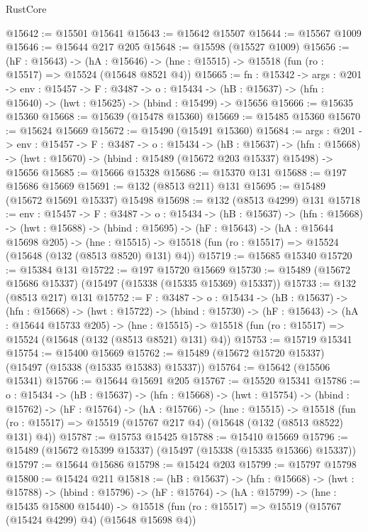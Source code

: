 \begin{lexlean}{RustCore}
\begin{coremodule}
@15642 := @15501 @15641
@15643 := @15642 @15507
@15644 := @15567 @1009
@15646 := @15644 @217 @205
@15648 := @15598 (@15527 @1009)
@15656 := (hF : @15643) ->
  (hA : @15646) -> (hne : @15515) -> @15518 (fun (ro : @15517) => @15524 (@15648 @8521 @4))
@15665 := {fn : @15342} ->
  {args : @201} ->
  {env : @15457} ->
  {F : @3487} ->
  {o : @15434} -> (hB : @15637) -> (hfn : @15640) -> (hwt : @15625) -> (hbind : @15499) -> @15656
@15666 := @15635 @15360
@15668 := @15639 (@15478 @15360)
@15669 := @15485 @15360
@15670 := @15624 @15669
@15672 := @15490 (@15491 @15360)
@15684 := {args : @201} ->
  {env : @15457} ->
  {F : @3487} ->
  {o : @15434} ->
  (hB : @15637) ->
  (hfn : @15668) -> (hwt : @15670) -> (hbind : @15489 (@15672 @203 @15337) @15498) -> @15656
@15685 := @15666 @15328
@15686 := @15370 @131
@15688 := @197 @15686 @15669
@15691 := @132 (@8513 @211) @131
@15695 := @15489 (@15672 @15691 @15337) @15498
@15698 := @132 (@8513 @4299) @131
@15718 := {env : @15457} ->
  {F : @3487} ->
  {o : @15434} ->
  (hB : @15637) ->
  (hfn : @15668) ->
  (hwt : @15688) ->
  (hbind : @15695) ->
  (hF : @15643) ->
  (hA : @15644 @15698 @205) ->
  (hne : @15515) -> @15518 (fun (ro : @15517) => @15524 (@15648 (@132 (@8513 @8520) @131) @4))
@15719 := @15685 @15340
@15720 := @15384 @131
@15722 := @197 @15720 @15669
@15730 := @15489 (@15672 @15686 @15337) (@15497 (@15338 (@15335 @15369) @15337))
@15733 := @132 (@8513 @217) @131
@15752 := {F : @3487} ->
  {o : @15434} ->
  (hB : @15637) ->
  (hfn : @15668) ->
  (hwt : @15722) ->
  (hbind : @15730) ->
  (hF : @15643) ->
  (hA : @15644 @15733 @205) ->
  (hne : @15515) -> @15518 (fun (ro : @15517) => @15524 (@15648 (@132 (@8513 @8521) @131) @4))
@15753 := @15719 @15341
@15754 := @15400 @15669
@15762 := @15489 (@15672 @15720 @15337) (@15497 (@15338 (@15335 @15383) @15337))
@15764 := @15642 (@15506 @15341)
@15766 := @15644 @15691 @205
@15767 := @15520 @15341
@15786 := {o : @15434} ->
  (hB : @15637) ->
  (hfn : @15668) ->
  (hwt : @15754) ->
  (hbind : @15762) ->
  (hF : @15764) ->
  (hA : @15766) ->
  (hne : @15515) ->
  @15518 (fun (ro : @15517) => @15519 (@15767 @217 @4) (@15648 (@132 (@8513 @8522) @131) @4))
@15787 := @15753 @15425
@15788 := @15410 @15669
@15796 := @15489 (@15672 @15399 @15337) (@15497 (@15338 (@15335 @15366) @15337))
@15797 := @15644 @15686
@15798 := @15424 @203
@15799 := @15797 @15798
@15800 := @15424 @211
@15818 := (hB : @15637) ->
  (hfn : @15668) ->
  (hwt : @15788) ->
  (hbind : @15796) ->
  (hF : @15764) ->
  (hA : @15799) ->
  (hne : @15435 @15800 @15440) ->
  @15518 (fun (ro : @15517) => @15519 (@15767 (@15424 @4299) @4) (@15648 @15698 @4))

\end{coremodule}
\end{lexlean}
